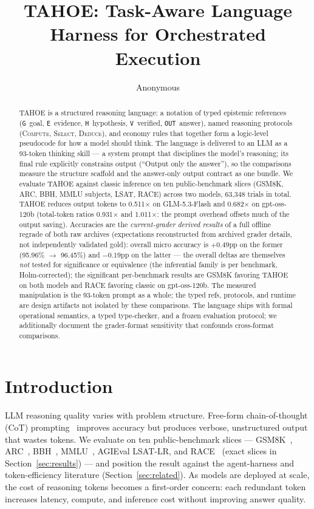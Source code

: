 \documentclass[11pt,a4paper]{article}
\title{TAHOE: Task-Aware Language Harness for Orchestrated Execution}
\author{Anonymous}
\date{}
\begin{document}
\maketitle

\begin{abstract}
TAHOE is a structured reasoning language: a notation of typed epistemic
references (\texttt{G}~goal, \texttt{E}~evidence, \texttt{H}~hypothesis,
\texttt{V}~verified, \texttt{OUT}~answer), named reasoning protocols
(\textsc{Compute}, \textsc{Select}, \textsc{Deduce}), and economy rules that
together form a logic-level pseudocode for how a model should think. The
language is delivered to an LLM as a 93-token thinking skill --- a system
prompt that disciplines the model's reasoning; its final rule explicitly
constrains output (``Output only the answer''), so the comparisons measure
the structure scaffold and the answer-only output contract as one bundle.
We evaluate TAHOE against classic inference on ten public-benchmark
slices (GSM8K, ARC, BBH, MMLU subjects, LSAT, RACE) across two models,
63{,}348 trials in total. TAHOE reduces output tokens to 0.511$\times$ on
GLM-5.3-Flash and 0.682$\times$ on gpt-oss-120b (total-token ratios
0.931$\times$ and 1.011$\times$: the prompt overhead offsets much of the
output saving). Accuracies are the \emph{current-grader derived results} of
a full offline regrade of both raw archives (expectations reconstructed from
archived grader details, not independently validated gold): overall micro
accuracy is $+0.49$pp on the former (95.96\% $\to$ 96.45\%) and $-0.19$pp on
the latter --- the overall deltas are themselves \emph{not} tested for
significance or equivalence (the inferential family is per benchmark,
Holm-corrected); the significant per-benchmark results are GSM8K favoring
TAHOE on both models and RACE favoring classic on gpt-oss-120b.
The measured manipulation is the 93-token prompt as a whole; the typed
refs, protocols, and runtime are design artifacts not isolated by these
comparisons. The language ships with formal operational semantics, a typed
type-checker, and a frozen evaluation protocol; we additionally document the
grader-format sensitivity that confounds cross-format comparisons.
\end{abstract}

\section{Introduction}

LLM reasoning quality varies with problem structure.
Free-form chain-of-thought (CoT) prompting~\cite{wei2022cot} improves accuracy but produces verbose, unstructured output that wastes tokens. We evaluate on ten public-benchmark slices --- GSM8K~\cite{cobbe2021gsm8k}, ARC~\cite{clark2018arc}, BBH~\cite{suzgun2022bbh}, MMLU~\cite{hendrycks2021mmlu}, AGIEval LSAT-LR, and RACE~\cite{lai2017race} (exact slices in Section~\ref{sec:results}) --- and position the result against the agent-harness and token-efficiency literature (Section~\ref{sec:related}).
As models are deployed at scale, the cost of reasoning tokens becomes a first-order concern: each redundant token increases latency, compute, and inference cost without improving answer quality.
\end{document}

